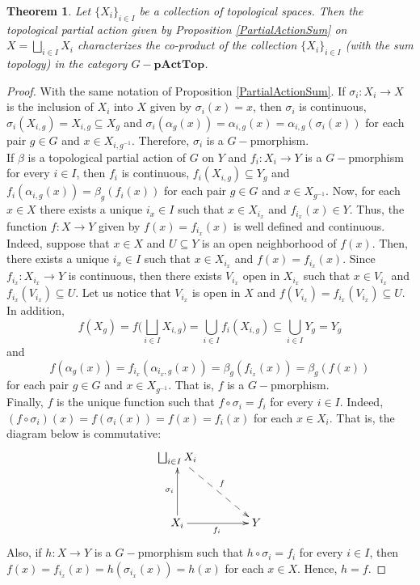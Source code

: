 \documentclass[sn-mathphys-num]{sn-jnl}%
\theoremstyle{thmstyleone}%
\newtheorem{theorem}{Theorem}%
\theoremstyle{thmstyletwo}%
\theoremstyle{thmstylethree}%
\begin{document}
\begin{theorem}
Let $ \{X_i \}_{i \in I} $ be a collection of topological spaces. Then the topological  partial action given by Proposition \ref{PartialActionSum} on 
  $ X = \bigsqcup_{i \in I} X_i $ characterizes the co-product of the collection $ \{X_i \}_{i \in I} $ (with the sum topology) in the category $G-\mathbf{pActTop}$.
\end{theorem}
\begin{proof}
With the same notation of Proposition \ref{PartialActionSum}. If $ \sigma_i: X_i \to X $ is the inclusion of $ X_i $ into $ X $ given by $ \sigma_i (x) = x $, then $ \sigma_i $ is continuous, $\sigma_i(X_{i,g})=X_{i,g}\subseteq X_g$ and $ \sigma_i (\alpha_g (x)) = \alpha_{i,g}(x) = \alpha_{i,g}(\sigma_i (x)) $ for each pair $ g \in G $ and $ x \in X_{i,g^{-1}} $. Therefore,  $ \sigma_i $ is a $G-$pmorphism.\\

If  $ \beta$ is a topological partial action of $G$ on $Y$ and $ f_i: X_i \to Y $ is a $G-$pmorphism for every $ i \in I $, then $ f_i $ is continuous, $f_i(X_{i,g})\subseteq Y_g$ and $f_i(\alpha_{i,g}(x))=\beta_g(f_i (x))$ for each pair $ g \in G $ and $ x \in X_{g^{-1}} $. Now, for each $ x \in X $ there exists a unique $ i_x \in I $ such that $ x \in X_{i_x} $ and $ f_{i_x} (x) \in Y $. Thus,  the function $ f: X \to Y $ given by $ f (x) = f_{i_x} (x) $ is well defined and continuous. Indeed, suppose that $x\in X$ and $U\subseteq Y$ is an open neighborhood of $f(x)$. Then, there exists a unique $ i_x \in I $ such that $ x \in X_{i_x} $ and $f(x)=f_{i_x}(x)$. Since $f_{i_x}:X_{i_x} \to Y $ is continuous, then there exists $V_{i_x}$ open in $X_{i_x}$ such that $x\in V_{i_x}$ and $f_{i_x}(V_{i_x})\subseteq U$. Let us notice that $V_{i_x}$ is open in $X$ and $f(V_{i_x})=f_{i_x}(V_{i_x})\subseteq U$. In addition,
$$f(X_g)=f\biggl(\bigsqcup_{i\in I}X_{i,g}\biggr)=\bigcup_{i\in I}f_i(X_{i,g})\subseteq\bigcup_{i\in I}Y_g=Y_g$$
and
$$ f (\alpha_g(x)) = f_{i_x} (\alpha_{i_x,g}(x)) = \beta_g(f_{i_x} (x)) = \beta_g(f (x)) $$ for each pair $ g \in G $ and $ x \in X_{g^{-1}} $. That is, $ f $ is a $G-$pmorphism.\\

Finally, $ f $ is the unique function such that $ f \circ \sigma_i = f_i $ for every $ i \in I $. Indeed, $ (f \circ \sigma_i) (x) = f (\sigma_i (x)) = f (x) = f_i (x) $ for each $ x \in X_i $. That is, the diagram below is commutative:
$$
\xymatrix@=1.5cm{
\bigsqcup_{i \in I}X_i\ar@{-->}[dr]^f& \\
X_i \ar[u]^{\sigma_i} \ar[r]_{f_i}&Y
}
$$
Also, if $ h: X \to Y $ is a $G-$pmorphism such that $ h \circ \sigma_i = f_i $ for  every  $ i \in I $, then $ f (x) = f_{i_x} (x) = h (\sigma_ {i_x} (x)) = h (x) $ for each $ x \in X $. Hence, $ h = f $.
\end{proof}
\end{document}
